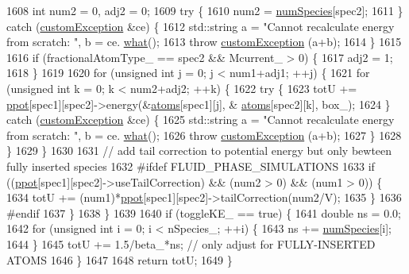 \begin{DoxyCode}
1608             \textcolor{keywordtype}{int} num2 = 0, adj2 = 0;
1609             \textcolor{keywordflow}{try} \{
1610                 num2 = \hyperlink{classsim_system_a9eea865e6dc1cff377b1e79c4d9c23f0}{numSpecies}[spec2];
1611             \} \textcolor{keywordflow}{catch} (\hyperlink{classcustom_exception}{customException} &ce) \{
1612                 std::string a = \textcolor{stringliteral}{"Cannot recalculate energy from scratch: "}, b = ce.
      \hyperlink{classcustom_exception_aeb6ab5848b038adfc68fde86a512f691}{what}();
1613                 \textcolor{keywordflow}{throw} \hyperlink{classcustom_exception}{customException} (a+b);
1614             \}
1615 
1616             \textcolor{keywordflow}{if} (fractionalAtomType\_ == spec2 && Mcurrent\_ > 0) \{
1617                 adj2 = 1;
1618             \}
1619 
1620             \textcolor{keywordflow}{for} (\textcolor{keywordtype}{unsigned} \textcolor{keywordtype}{int} j = 0; j < num1+adj1; ++j) \{
1621                 \textcolor{keywordflow}{for} (\textcolor{keywordtype}{unsigned} \textcolor{keywordtype}{int} k = 0; k < num2+adj2; ++k) \{
1622                     \textcolor{keywordflow}{try} \{
1623                         totU += \hyperlink{classsim_system_ad2e290b5963f132e6a3a56cee35c8e9f}{ppot}[spec1][spec2]->energy(&\hyperlink{classsim_system_a90421b19082f7fb8fc23b7264b1161e4}{atoms}[spec1][j], &
      \hyperlink{classsim_system_a90421b19082f7fb8fc23b7264b1161e4}{atoms}[spec2][k], box\_);
1624                     \} \textcolor{keywordflow}{catch} (\hyperlink{classcustom_exception}{customException} &ce) \{
1625                         std::string a = \textcolor{stringliteral}{"Cannot recalculate energy from scratch: "}, b = ce.
      \hyperlink{classcustom_exception_aeb6ab5848b038adfc68fde86a512f691}{what}();
1626                         \textcolor{keywordflow}{throw} \hyperlink{classcustom_exception}{customException} (a+b);
1627                     \}
1628                 \}
1629             \}
1630 
1631             \textcolor{comment}{// add tail correction to potential energy but only bewteen fully inserted species}
1632 \textcolor{preprocessor}{#ifdef FLUID\_PHASE\_SIMULATIONS}
1633 \textcolor{preprocessor}{}            \textcolor{keywordflow}{if} ((\hyperlink{classsim_system_ad2e290b5963f132e6a3a56cee35c8e9f}{ppot}[spec1][spec2]->useTailCorrection) && (num2 > 0) && (num1 > 0)) \{
1634                 totU += (num1)*\hyperlink{classsim_system_ad2e290b5963f132e6a3a56cee35c8e9f}{ppot}[spec1][spec2]->tailCorrection(num2/V);
1635             \}
1636 \textcolor{preprocessor}{#endif}
1637 \textcolor{preprocessor}{}        \}
1638     \}
1639 
1640     \textcolor{keywordflow}{if} (toggleKE\_ == \textcolor{keyword}{true}) \{
1641         \textcolor{keywordtype}{double} ns = 0.0;
1642         \textcolor{keywordflow}{for} (\textcolor{keywordtype}{unsigned} \textcolor{keywordtype}{int} i = 0; i < nSpecies\_; ++i) \{
1643             ns += \hyperlink{classsim_system_a9eea865e6dc1cff377b1e79c4d9c23f0}{numSpecies}[i];
1644         \}
1645         totU += 1.5/beta\_*ns; \textcolor{comment}{// only adjust for FULLY-INSERTED ATOMS}
1646     \}
1647 
1648     \textcolor{keywordflow}{return} totU;
1649 \}
\end{DoxyCode}
